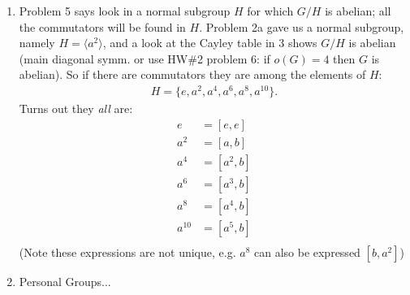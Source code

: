 \begin{enumerate}
    Now $G/H=\{\text{(right) cosets of $H$ in $G$}\}$ is a group since $H\triangleleft G$, we will show $G/H$ is abelian by using 4a. We must show $[Hx,Hy]=H \ \forall \  Hx, Hy \in G/H$
    \begin{align*}
        [Hx,Hy]=HxHy(Hx)^{-1}(Hy)^{-1}=HxHyHx^{-1}Hy^{-1}=Hxyx^{-1}y^{-1},
    \end{align*}
    and our hypothesis $\Rightarrow \ xyx^{-1}y^{-1}\in H$, i.e. the coset of $xyx^{-1}y^{-1}$ IS $H$ (cosets not disjoint must be identical) \\
    $\therefore$ $[Hx,Hy]=Hxyx^{-1}y^{-1}=H$, so $G/H$ is abelian by 4a.\\
    $\boxed{\Leftarrow \ :}$ Assume $H\triangleleft G$ and $G/H$ abelian. Take $x,y \in G$, we must show $[x,y]\in H$. First note $G/H$ is an abelian group (it is a group because $H\triangleleft G$)\\
    so 
    \begin{align*}
        HxHy=HyHx \implies Hxy=Hyx &\implies Hxyx^{-1}=Hy \\
        &\implies Hxyx^{-1}y^{-1}= H 
    \end{align*}
    This last equation says $Hxyx^{-1}y^{-1}$'s coset is $H$ which puts $xyx^{-1}y^{-1}\in H$, so $[x,y]\in H$. $\blacksquare$

    \item Problem 5 says look in a normal subgroup $H$ for which $G/H$ is abelian; all the commutators will be found in $H$. Problem 2a gave us a normal subgroup, namely $H=\langle a^2\rangle$, and a 
    look at the Cayley table in 3 shows $G/H$ is abelian (main diagonal symm. or use HW\#2 problem 6: if $o(G)=4$ then $G$ is abelian). So if there are commutators they are among the elements of $H$:
    \begin{align*}
        H=\{e, a^2,a^4,a^6,a^8,a^{10}\}.
    \end{align*}
    Turns out they \textit{all} are: 
    \begin{align*}
        e&=[e,e] \\
        a^2&=[a,b]\\
        a^4&=[a^2,b]\\
        a^6&=[a^3,b]\\
        a^8&=[a^4,b]\\
        a^{10}&=[a^5,b]\\
    \end{align*}
    (Note these expressions are not unique, e.g. $a^8$ can also be expressed $[b,a^2]$)
    \item Personal Groups...
\end{enumerate}



